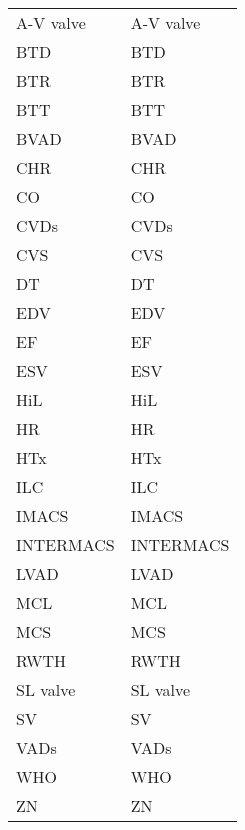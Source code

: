 \begin{tabularx}{\textwidth}{p{}X}
\acs{A-V valve} & \acl{A-V valve} \\
\acs{BTD} & \acl{BTD} \\
\acs{BTR} & \acl{BTR} \\
\acs{BTT} & \acl{BTT} \\
\acs{BVAD} & \acl{BVAD} \\
\acs{CHR} & \acl{CHR} \\
\acs{CO} & \acl{CO} \\
\acs{CVDs} & \acl{CVDs} \\
\acs{CVS} & \acl{CVS} \\
\acs{DT} & \acl{DT} \\
\acs{EDV} & \acl{EDV} \\
\acs{EF} & \acl{EF} \\
\acs{ESV} & \acl{ESV} \\
\acs{HiL} & \acl{HiL} \\
\acs{HR} & \acl{HR} \\
\acs{HTx} & \acl{HTx} \\
\acs{ILC} & \acl{ILC} \\
\acs{IMACS} & \acl{IMACS}\\
\acs{INTERMACS} & \acl{INTERMACS}\\
\acs{LVAD} & \acl{LVAD} \\
\acs{MCL} & \acl{MCL} \\
\acs{MCS} & \acl{MCS} \\
\acs{RWTH} & \acl{RWTH}\\
\acs{SL valve} & \acl{SL valve}\\
\acs{SV} & \acl{SV} \\
\acs{VADs} & \acl{VADs} \\
\acs{WHO} & \acl{WHO} \\
\acs{ZN} & \acl{ZN} \\
\end{tabularx}
%
%
%
